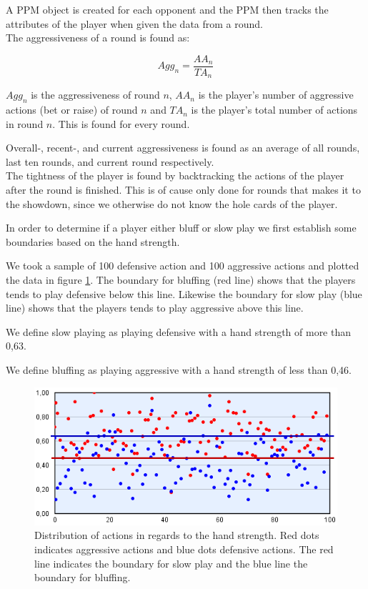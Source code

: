 A PPM object is created for each opponent and the PPM then tracks the attributes of the player when given the data from a round.\\

The aggressiveness of a round is found as:

\[Agg_{n} = \frac{AA_{n}}{TA_{n}}\]

$Agg_{n}$ is the aggressiveness of round $n$, $AA_{n}$ is the player's number of aggressive actions (bet or raise) of round $n$ and  $TA_{n}$ is the player's total number of actions in round $n$. This is found for every round. 

Overall-, recent-, and current aggressiveness is found as an average of all rounds, last ten rounds, and current round respectively.\\

The tightness of the player is found by backtracking the actions of the player after the round is finished. This is of cause only done for rounds that makes it to the showdown, since we otherwise do not know the hole cards of the player.

In order to determine if a player either bluff or slow play we first establish some boundaries based on the hand strength. 

We took a sample of 100 defensive action and 100 aggressive actions and plotted the data in figure \ref{fig:dist-act}. The boundary for bluffing (red line) shows that the players tends to play defensive below this line. Likewise the boundary for slow play (blue line) shows that the players tends to play aggressive above this line.

We define slow playing as playing defensive with a hand strength of more than 0,63.

We define bluffing as playing aggressive with a hand strength of less than 0,46.

\begin{figure}[H]
  \center
    \includegraphics[scale=0.775]{images/modeling/action-dist.png}
  \caption{Distribution of actions in regards to the hand strength. Red dots indicates aggressive actions and blue dots defensive actions. The red line indicates the boundary for slow play and the blue line the boundary for bluffing. \label{fig:dist-act}}
\end{figure}





